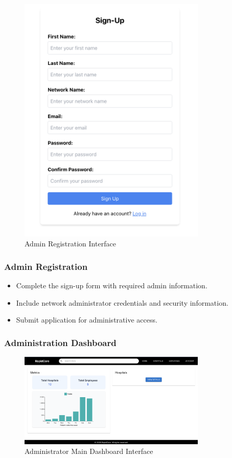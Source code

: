 \documentclass[12pt, titlepage]{article}
\begin{document}
\begin{figure}[H]
\centering
\includegraphics[width=0.8\textwidth]{signup.png}
\caption{Admin Registration Interface}
\label{fig:Registration}
\end{figure}


\subsubsection{Admin Registration}
\begin{itemize}
\item Complete the sign-up form with required admin information.
\item Include network administrator credentials and security information.
\item Submit application for administrative access.
\end{itemize}

\subsubsection{Administration Dashboard}
\begin{figure}[H]
\centering
\includegraphics[width=0.8\textwidth]{admin.png}
\caption{Administrator Main Dashboard Interface}
\label{fig:admin_dashboard}
\end{figure}
\end{document}
